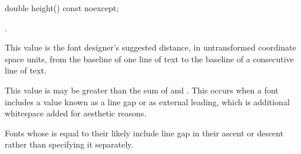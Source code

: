 \begin{itemdecl}
    double height() const noexcept;
\end{itemdecl}
\begin{itemdescr}
	\pnum
	\returns
	.
	
	\pnum
	\remarks
	This value is the font designer's suggested distance, in untransformed coordinate space units, from the baseline of one line of text to the baseline of a consecutive line of text.
	
	\pnum
	This value is may be greater than the sum of  and . This occurs when a font includes a value known as a line gap or as external leading, which is additional whitespace added for aesthetic reasons.
	
	\pnum	
	Fonts whose  is equal to their  likely include line gap in their ascent or descent rather than specifying it separately.

\end{itemdescr}
